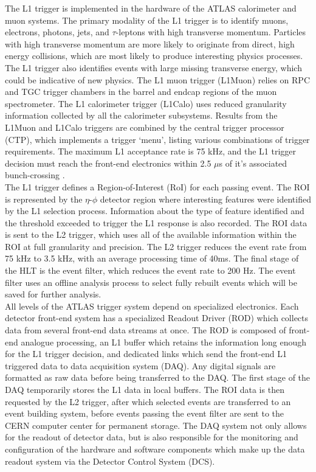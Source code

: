 	The L1 trigger is implemented in the hardware of the ATLAS calorimeter and muon systems. The primary modality of the L1 trigger is to identify muons, electrons, photons, jets, and $\tau$-leptons with high transverse momentum. Particles with high transverse momentum are more likely to originate from direct, high energy collisions, which are most likely to produce interesting physics processes. The L1 trigger also identifies events with large missing transverse energy, which could be indicative of new physics. The L1 muon trigger (L1Muon) relies on RPC and TGC trigger chambers in the barrel and endcap regions of the muon spectrometer. The L1 calorimeter trigger (L1Calo) uses reduced granularity information collected by all the calorimeter subsystems. Results from the L1Muon and L1Calo triggers are combined by the central trigger processor (CTP), which implements a trigger `menu', listing various combinations of trigger requirements. The maximum L1 acceptance rate is 75 kHz, and the L1 trigger decision must reach the front-end electronics within 2.5 $\mu$s of it's associated bunch-crossing \cite{atlas_overview}.\\
	
	The L1 trigger defines a Region-of-Interest (RoI) for each passing event. The ROI is represented by the $\eta$-$\phi$ detector region where interesting features were identified by the L1 selection process. Information about the type of feature identified and the threshold exceeded to trigger the L1 response is also recorded. The ROI data is sent to the L2 trigger, which uses all of the available information within the ROI at full granularity and precision. The L2 trigger reduces the event rate from 75 kHz to 3.5 kHz, with an average processing time of 40ms. The final stage of the HLT is the event filter, which reduces the event rate to 200 Hz. The event filter uses an offline analysis process to select fully rebuilt events which will be saved for further analysis. \\
	
	All levels of the ATLAS trigger system depend on specialized electronics. Each detector front-end system has a specialized Readout Driver (ROD) which collects data from several front-end data streams at once. The ROD is composed of front-end analogue processing, an L1 buffer which retains the information long enough for the L1 trigger decision, and dedicated links which send the front-end L1 triggered data to data acquisition system (DAQ). Any digital signals are formatted as raw data before being transferred to the DAQ.  The first stage of the DAQ temporarily stores the L1 data in local buffers. The ROI data is then requested by the L2 trigger, after which selected events are transferred to an event building system, before events passing the event filter are sent to the CERN computer center for permanent storage. The DAQ system not only allows for the readout of detector data, but is also responsible for the monitoring and configuration of the hardware and software components which make up the data readout system via the Detector Control System (DCS). \\
	
